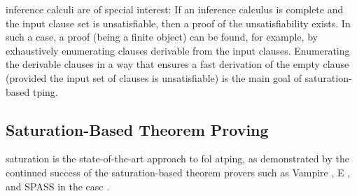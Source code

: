  inference calculi are of special interest:
If an inference calculus is complete and the input clause set is unsatisfiable,
then a proof of the unsatisfiability exists.
In such a case, a proof (being a finite object) can be found, for example, by
exhaustively
enumerating clauses derivable from the input clauses.
Enumerating the derivable clauses in a way that ensures a fast derivation of the empty clause (provided the input set of clauses is unsatisfiable) is the main goal of saturation-based \gls{tping}.




\subsection{Saturation-Based Theorem Proving}

\Gls{saturation} is the state-of-the-art approach to \gls{fol} \gls{atping},
as demonstrated by the continued success of the saturation-based theorem provers such as Vampire \cite{DBLP:conf/cav/KovacsV13}, E \cite{DBLP:conf/cade/0001CV19}, and SPASS \cite{DBLP:conf/cade/WeidenbachDFKSW09} in the \gls{casc} \cite{Sut16}.

